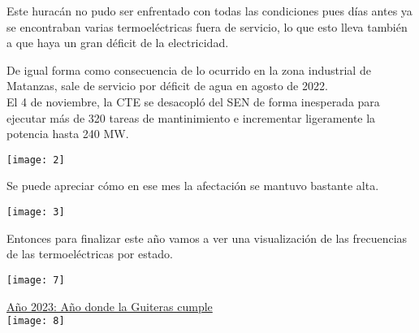 \documentclass{article}
\begin{document}
\vspace{0.5cm}

Este huracán no pudo ser enfrentado con todas las condiciones pues días antes ya se encontraban varias termoeléctricas fuera de servicio, lo que esto lleva también a que haya un gran déficit de la electricidad.\\

\vspace{0.5cm}

De igual forma como consecuencia de lo ocurrido en la zona industrial de Matanzas, sale de servicio por déficit de agua en agosto de 2022.\\
El 4 de noviembre, la CTE se desacopló del SEN de forma inesperada para ejecutar más de 320 tareas de mantinimiento e incrementar ligeramente la potencia hasta 240 MW.\\

\vspace{1cm}
\begin{center}
    \texttt{[image: 2]}\\
\end{center}

\vspace{1cm}

Se puede apreciar cómo en ese mes la afectación se mantuvo bastante alta.\\

\vspace{0.5cm}
\begin{center}
   \texttt{[image: 3]} \\
\end{center}

\vspace{0.5cm}

Entonces para finalizar este año vamos a ver una visualización de las frecuencias de las termoeléctricas por estado.\\

\vspace{1cm}

\begin{center}
    \texttt{[image: 7]}\\
    
    \vspace{1cm}

    \underline{Año 2023: Año donde la Guiteras cumple}\\

    \vspace{1cm}
    \texttt{[image: 8]} \\
    
\end{center}
\end{document}
